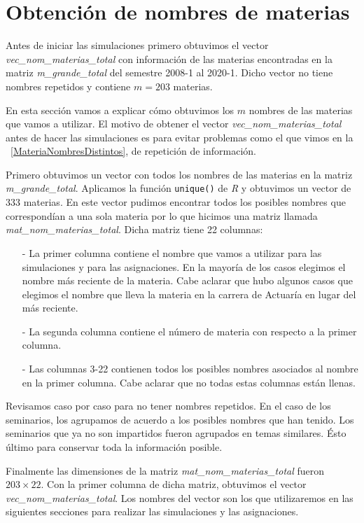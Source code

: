 \section{Obtención de nombres de materias}

Antes de iniciar las simulaciones primero obtuvimos el vector \textit{vec\_nom\_materias\_total} con información de las materias encontradas en la matriz \textit{m\_grande\_total} del semestre 2008-1 al 2020-1. Dicho vector  no tiene nombres repetidos y contiene $m = 203$ materias.

En esta sección vamos a explicar cómo obtuvimos los $m$ nombres de las materias que vamos a utilizar. El motivo de obtener el vector \textit{vec\_nom\_materias\_total} antes de hacer las simulaciones es para evitar problemas como el que vimos en la \figurename{~\ref{MateriaNombresDistintos}}, de repetición de información.

Primero obtuvimos un vector con todos los nombres de las materias en la matriz \textit{m\_grande\_total}. Aplicamos la función \verb+unique()+ de \textit{R} y obtuvimos un vector de 333 materias. En este vector pudimos encontrar todos los posibles nombres que correspondían a una sola materia por lo que hicimos una matriz llamada \textit{mat\_nom\_materias\_total}. Dicha matriz tiene 22 columnas:

\begin{itemize}
\item[-] La primer columna contiene el nombre que vamos a utilizar para las simulaciones y para las asignaciones. En la mayoría de los casos elegimos el nombre más reciente de la materia. Cabe aclarar que hubo algunos casos que elegimos el nombre que lleva la materia en la carrera de Actuaría en lugar del más reciente.

\item[-] La segunda columna contiene el número de materia con respecto a la primer columna.

\item[-] Las columnas 3-22 contienen todos los posibles nombres asociados al nombre en la primer columna. Cabe aclarar que no todas estas columnas están llenas.
\end{itemize}

Revisamos caso por caso para no tener nombres repetidos. En el caso de los seminarios, los agrupamos de acuerdo a los posibles nombres que han tenido. Los seminarios que ya no son impartidos fueron agrupados en temas similares. Ésto último para conservar toda la información posible.

Finalmente las dimensiones de la matriz \textit{mat\_nom\_materias\_total} fueron $203 \times 22$. Con la primer columna de dicha matriz, obtuvimos el vector \textit{vec\_nom\_materias\_total}. Los nombres del vector son los que utilizaremos en las siguientes secciones para realizar las simulaciones y las asignaciones.
